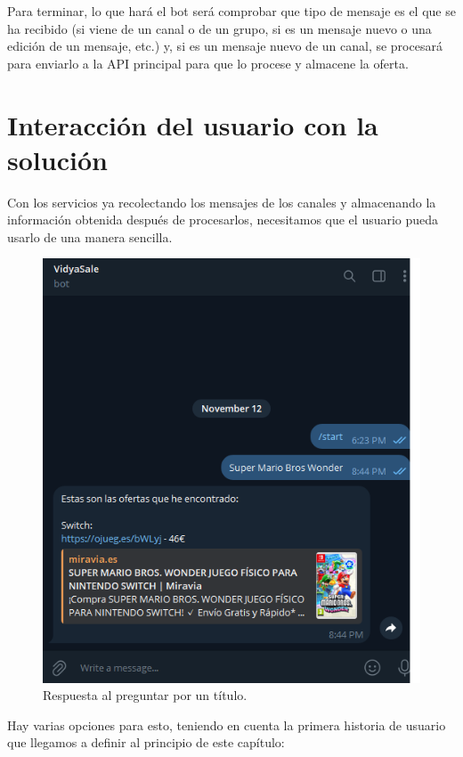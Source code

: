 Para terminar, lo que hará el bot será comprobar que tipo de mensaje es el que se 
ha recibido (si viene de un canal o de un grupo, si es un mensaje nuevo o una 
edición de un mensaje, etc.) y, si es un mensaje nuevo de un canal, se procesará 
para enviarlo a la API principal para que lo procese y almacene la oferta.

\section{Interacción del usuario con la solución}

Con los servicios ya recolectando los mensajes de los canales y almacenando la 
información obtenida después de procesarlos, necesitamos que el usuario pueda 
usarlo de una manera sencilla.

\begin{figure}[h]
    \centering
    \includegraphics[scale=0.6]{figuras/respuesta-bot.png}
    \caption{Respuesta al preguntar por un título.}
    \label{fig:respuesta_bot}
\end{figure}


Hay varias opciones para esto, teniendo en cuenta la primera historia de usuario 
que llegamos a definir al principio de este capítulo:

